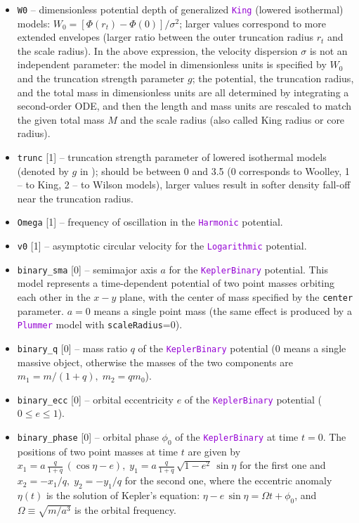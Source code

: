 \documentclass[12pt]{article}
\newcommand{\ttt}[1]{\textcolor{darkviolet}{\texttt{#1}}}
\newcommand{\ppp}[1]{\textcolor{darkolive} {\texttt{#1}}}
\begin{document}
\begin{itemize}
\item \ppp{W0} -- dimensionless potential depth of generalized \ttt{King} (lowered isothermal) models: $W_0 = [ \Phi(r_t) - \Phi(0) ] / \sigma^2$; larger values correspond to more extended envelopes (larger ratio between the outer truncation radius $r_t$ and the scale radius). In the above expression, the velocity dispersion $\sigma$ is not an independent parameter: the model in dimensionless units is specified by $W_0$ and the truncation strength parameter $g$; the potential, the truncation radius, and the total mass in dimensionless units are all determined by integrating a second-order ODE, and then the length and mass units are rescaled to match the given total mass $M$ and the scale radius (also called King radius or core radius).
\item \ppp{trunc} [1] -- truncation strength parameter of lowered isothermal models (denoted by $g$ in \cite{GielesZocchi2015}); should be between 0 and 3.5 (0 corresponds to Woolley, 1 -- to King, 2 -- to Wilson models), larger values result in softer density fall-off near the truncation radius.
\item \ppp{Omega} [1] -- frequency of oscillation in the \ttt{Harmonic} potential.
\item \ppp{v0} [1] -- asymptotic circular velocity for the \ttt{Logarithmic} potential.
\item \ppp{binary_sma} [0] -- semimajor axis $a$ for the \ttt{KeplerBinary} potential. This model represents a time-dependent potential of two point masses orbiting each other in the $x-y$ plane, with the center of mass specified by the \ppp{center} parameter. $a=0$ means a single point mass (the same effect is produced by a \ttt{Plummer} model with \ppp{scaleRadius}=0).
\item \ppp{binary_q} [0] -- mass ratio $q$ of the \ttt{KeplerBinary} potential (0 means a single massive object, otherwise the masses of the two components are $m_1=m/(1+q),\; m_2=qm_0$).
\item \ppp{binary_ecc} [0] -- orbital eccentricity $e$ of the \ttt{KeplerBinary} potential ($0\le e \le 1$).
\item \ppp{binary_phase} [0] -- orbital phase $\phi_0$ of the \ttt{KeplerBinary} at time $t=0$. The positions of two point masses at time $t$ are given by $x_1 = a\,\frac{q}{1+q}\, (\cos\eta-e),\; y_1 = a\,\frac{q}{1+q}\,\sqrt{1-e^2}\,\sin\eta$ for the first one and $x_2=-x_1/q,\; y_2=-y_1/q$ for the second one, where the eccentric anomaly $\eta(t)$ is the solution of Kepler's equation: $\eta - e\,\sin\eta = \Omega t + \phi_0$, and $\Omega \equiv \sqrt{m/a^3}$ is the orbital frequency.
\end{itemize}
\end{document}

